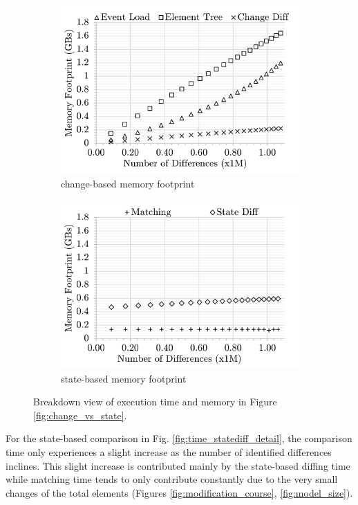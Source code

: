 \documentclass{llncs}
\begin{document}
\begin{figure}[ht]
\begin{subfigure}[t]{0.495\linewidth}
    \includegraphics[width=\linewidth]{images/Memory-ChangeDiff-Detail}
    \caption{change-based memory footprint}
    \label{fig:memory_changediff_detail}
\end{subfigure}
\hfill
\begin{subfigure}[t]{0.495\linewidth}
    \includegraphics[width=\linewidth]{images/Memory-StateDiff-Detail}
    \caption{state-based memory footprint}
    \label{fig:memory_statediff_detail}
\end{subfigure}
    \caption{Breakdown view of execution time and memory in Figure \ref{fig:change_vs_state}.}
    \label{fig:time_memory_detail}
\end{figure}

For the state-based comparison in Fig. \ref{fig:time_statediff_detail}, the comparison time only experiences a slight increase as the number of identified differences inclines. This slight increase is contributed mainly by the state-based diffing time while matching time tends to only contribute constantly due to the very small changes of the total elements (Figures \ref{fig:modification_course}, \ref{fig:model_size}).
\end{document}
